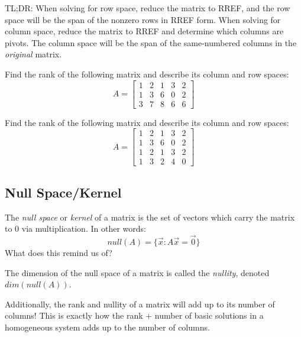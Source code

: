 \documentclass[11pt]{exam}
\begin{document}
    TL;DR: When solving for row space, reduce the matrix to RREF, and the row space will be the span of the nonzero rows in RREF form.
    When solving for column space, reduce the matrix to RREF and determine which columns are pivots. The column space will be the span of the
    same-numbered columns in the \textit{original} matrix.

    \begin{questions}
        \item Find the rank of the following matrix and describe its column and row spaces:
        $$A = \begin{bmatrix} 1 & 2 & 1 & 3 & 2 \\ 1 & 3 & 6 & 0 & 2 \\ 3 & 7 & 8 & 6 & 6 \end{bmatrix}$$

        \item Find the rank of the following matrix and describe its column and row spaces:
        $$A = \begin{bmatrix} 1 & 2 & 1 & 3 & 2 \\ 1 & 3 & 6 & 0 & 2 \\ 1 & 2 & 1 & 3 & 2 \\ 1 & 3 & 2 & 4 & 0 \end{bmatrix}$$
    \end{questions}

    \pagebreak
    \subsection{Null Space/Kernel}
    The \textit{null space} or \textit{kernel} of a matrix is the set of vectors which carry the matrix to 0 via multiplication. In other words:
    $$null(A) = \{ \vec{x}: A \vec{x} = \vec{0} \}$$
    What does this remind us of?

    The dimension of the null space of a matrix is called the \textit{nullity}, denoted $dim(null(A))$.

    Additionally, the rank and nullity of a matrix will add up to its number of columns! This is exactly how the rank + number of basic solutions
    in a homogeneous system adds up to the number of columns.
\end{document}
